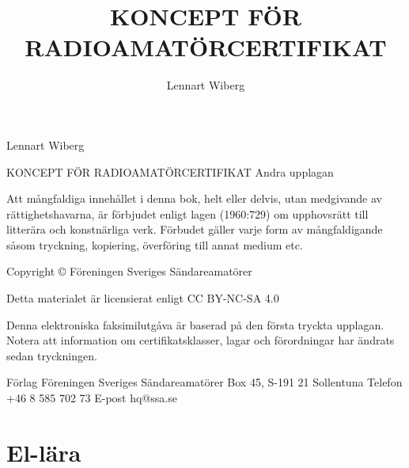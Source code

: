 \documentclass[a4paper,twoside,twocolumn,openright]{book}
\begin{document}
\frontmatter
\title{KONCEPT FÖR RADIOAMATÖRCERTIFIKAT}
\author{Lennart Wiberg}
\maketitle

Lennart Wiberg

KONCEPT FÖR RADIOAMATÖRCERTIFIKAT
Andra upplagan

Att mångfaldiga innehållet i denna bok, helt eller delvis, utan medgivande av
rättighetshavarna, är förbjudet enligt lagen (1960:729) om upphovsrätt till
litterära och konstnärliga verk. Förbudet gäller varje form av mångfaldigande
såsom tryckning, kopiering, överföring till annat medium etc.

Copyright © Föreningen Sveriges Sändareamatörer

Detta materialet är licensierat enligt CC BY-NC-SA 4.0

Denna elektroniska faksimilutgåva är baserad på den första tryckta
upplagan. Notera att information om certifikatsklasser, lagar och
förordningar har ändrats sedan tryckningen.


Förlag
Föreningen Sveriges Sändareamatörer
Box 45, S-191 21 Sollentuna
Telefon +46 8 585 702 73
E-post hq@ssa.se


\tableofcontents

\mainmatter










\chapter{El-lära}


\cleardoublepage

\cleardoublepage

\cleardoublepage

\cleardoublepage

\cleardoublepage

\cleardoublepage

\cleardoublepage

\cleardoublepage


















\appendix













\listoffigures
\listoftables

\backmatter

\printindex
\end{document}
